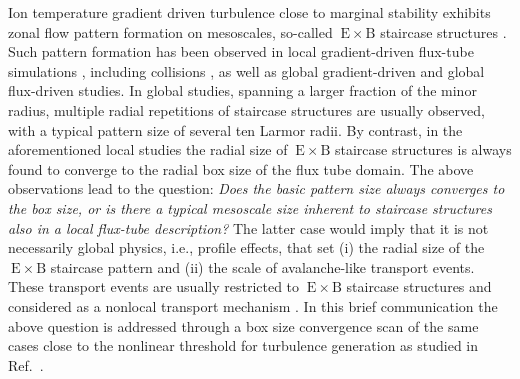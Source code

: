 \documentclass[aip, amsmath, amssymb, reprint, twocolumn, floatfix]{revtex4-1}
\newcommand{\exb}{\mathrm{\:E}\times\mathrm{B}}
\begin{document}
Ion temperature gradient driven turbulence close to marginal stability exhibits zonal flow pattern formation on mesoscales, so-called $\exb$ staircase structures \cite{Pradalier2010}.
Such pattern formation has been observed in local gradient-driven flux-tube simulations \cite{Peeters2016, Rath2021}, including collisions \cite{Weikl2017}, as well as global gradient-driven \cite{McMillan2009, Villard2013, Seo2022} and global flux-driven \cite{Pradalier2010, Pradalier2015, Wang2020, Kim2022, Kishimoto2023} studies. 
In global studies, spanning a larger fraction of the minor radius, multiple radial repetitions of staircase structures are usually observed, with a typical pattern size of several ten Larmor radii.
By contrast, in the aforementioned local studies the radial size of $\exb$ staircase structures is always found to converge to the radial box size of the flux tube domain.
The above observations lead to the question: 
\textit{Does the basic pattern size always converges to the box size, or is there a typical mesoscale size inherent to staircase structures also in a local flux-tube description?}
The latter case would imply that it is not necessarily global physics, i.e., profile effects, that set (i) the radial size of the $\exb$ staircase pattern and (ii) the scale of avalanche-like transport events. These transport events are usually restricted to $\exb$ staircase structures and considered as a nonlocal transport mechanism \cite{Pradalier2010}. 
In this brief communication the above question is addressed through a box size convergence scan of the same cases close to the nonlinear threshold for turbulence generation as studied in Ref.~.\bigskip

\end{document}
